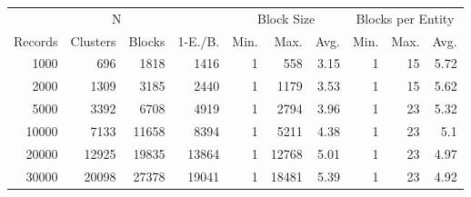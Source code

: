 \begin{tabular}{|rrrr|rrr|rrr|}
\hline
   \multicolumn{4}{|c|}{N} &  \multicolumn{3}{|c|}{Block Size} & \multicolumn{3}{|c|}{Blocks per Entity} \\
   Records &   Clusters &   Blocks &        1-E./B. &   Min. &   Max. &    Avg. &   Min. &   Max. &    Avg. \\
\hline
      1000 &        696 &     1818 &           1416 &      1 &    558 &   3.15 &      1 &     15 &   5.72 \\
      2000 &       1309 &     3185 &           2440 &      1 &   1179 &   3.53 &      1 &     15 &   5.62 \\
      5000 &       3392 &     6708 &           4919 &      1 &   2794 &   3.96 &      1 &     23 &   5.32 \\
     10000 &       7133 &    11658 &           8394 &      1 &   5211 &   4.38 &      1 &     23 &   5.1  \\
     20000 &      12925 &    19835 &          13864 &      1 &  12768 &   5.01 &      1 &     23 &   4.97 \\
     30000 &      20098 &    27378 &          19041 &      1 &  18481 &   5.39 &      1 &     23 &   4.92 \\
\hline
\end{tabular}
